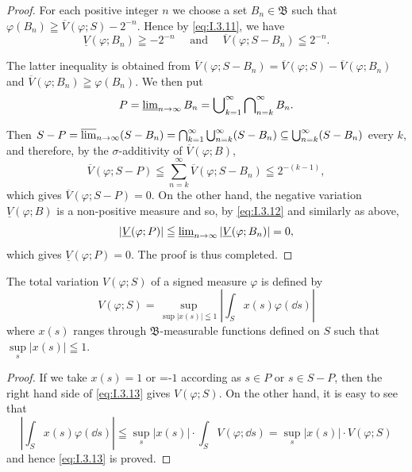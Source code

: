 \begin{proof}
 For each positive integer $n$ we choose a set $B_n \in \mathfrak{B}$ such that $\varphi(B_n) \geqq \overline{V}(\varphi; S)- 2^{-n}$. Hence by \eqref{eq:I.3.11}, we have 
\begin{equation}\label{eq:I.3.12}
\underline {{{V}}} (\varphi ; B_{n}) \geqq- 2 ^{-n} \quad \text{ and } \quad \overline {{{V}}} (\varphi ; S- B_{n}) \leqq 2 ^{-n}. \end{equation}

The latter inequality is obtained from $\overline{V} (\varphi ;S- B_n) = \overline{V} (\varphi ;S)- \overline{V} (\varphi ;B_n)$ and $\overline{V} (\varphi ;B_n)\geqq \varphi (B_n)$. We then put 
\[
P= \varliminf\limits_{n \to \infty} B_{n} = \bigcup\limits_{k=1} ^{\infty} \bigcap\limits_{n=k} ^{\infty} B_{n}.
\]

Then $S- P= \varlimsup\limits_{n\to \infty}(S- B_n) = \bigcap\limits_{k=1}^{\infty}\bigcup\limits_{n=k}^{\infty}(S- B_n)\subseteq \bigcup\limits_{n=k}^{\infty}(S- B_n)$ every $k$, and therefore, by the $\sigma$-additivity of $\overline{V} (\varphi ;B)$, 
\[
\overline {{{V}}} (\varphi ; S- P) \leqq \sum\limits_{n=k} ^{\infty} \overline {{{V}}} (\varphi ; S- B_{n}) \leqq 2 ^{-(k-1)},
\]
which gives $\overline{V}(\varphi; S- P) = 0$. On the other hand, the negative variation $\underline{V}(\varphi; B)$ is a non-positive measure and so, by \eqref{eq:I.3.12} and similarly as above, 
\[
\left| \underline {{V}} (\varphi ; P) \right| \leqq \varliminf\limits_{n \rightarrow \infty} \left| \underline {{V}} (\varphi ; B_{n}) \right| = 0,
\]
which gives $\underline{V} (\varphi ;P) = 0$. The proof is thus completed. 
\end{proof}

\begin{corollaryu} The total variation $V(\varphi; S)$ of a signed measure $\varphi$ is defined by 
\begin{equation}\label{eq:I.3.13}
V (\varphi ; S) = \sup\limits_{\sup| x (s) | \leqq 1} \left| \int_{S} x (s) \varphi (\dd s) \right|
\end{equation}
where $x(s)$ ranges through $\mathfrak{B}$-measurable functions defined on $S$ such that $\sup\limits_{s}|x(s)| \leqq 1$. 
\end{corollaryu}

\begin{proof}
 If we take $x(s) = 1$ or =-$1$ according as $s \in P$ or $s \in S- P$, then the right hand side of \eqref{eq:I.3.13} gives $V(\varphi; S)$. On the other hand, it is easy to see that 
\[
\left| \int_{S} x (s) \varphi (\dd s) \right| \leqq \sup\limits_{s} | x (s) | \cdot \int_{S} V (\varphi ; \dd s) = \sup\limits_{s} | x (s) | \cdot V (\varphi ; S)
\]
and hence \eqref{eq:I.3.13} is proved. 
\end{proof}


